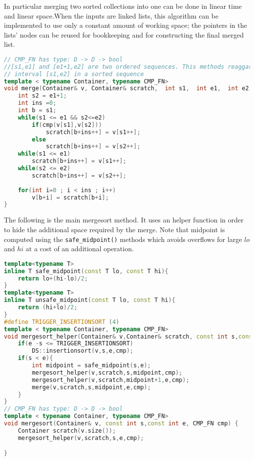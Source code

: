 In particular merging two sorted collections into one can be done in linear time and linear space.When the inputs are linked lists, this algorithm can be implemented to use only a constant amount of working space; the pointers in the lists' nodes can be reused for bookkeeping and for constructing the final merged list.

\begin{lstlisting}[language=c++, caption="Bubble-sort implementation in C++14"]
// CMP_FN has type: D -> D -> bool
//[s1,e1] and [e1+1,e2] are two ordered sequences. This methods reaggarne the whole
// interval [s1,e2] in a sorted sequence
template < typename Container, typename CMP_FN>
void merge(Container& v, Container& scratch,  int s1,  int e1,  int e2,CMP_FN cmp){
    int s2 = e1+1;
    int ins =0;
    int b = s1;
    while(s1 <= e1 && s2<=e2)
        if(cmp(v[s1],v[s2]))
            scratch[b+ins++] = v[s1++];
        else
            scratch[b+ins++] = v[s2++];
    while(s1 <= e1)
        scratch[b+ins++] = v[s1++];
    while(s2 <= e2)
        scratch[b+ins++] = v[s2++];
        
    for(int i=0 ; i < ins ; i++)
        v[b+i] = scratch[b+i];
}
\end{lstlisting}

The following is the main mergesort method. It uses an helper function in order to hide the additional space required by the merge. Note that midpoint is computed using the \texttt{safe\_midpoint()} methods which avoids overflows for large $lo$ and $hi$ at a cost of an additional operation.

\begin{lstlisting}[language=c++, caption="Merge-sort"]
template<typename T>
inline T safe_midpoint(const T lo, const T hi){
    return lo+(hi-lo)/2;
}
template<typename T>
inline T unsafe_midpoint(const T lo, const T hi){
    return (hi+lo)/2;
}
#define TRIGGER_INSERTIONSORT (4)
template < typename Container, typename CMP_FN>
void mergesort_helper(Container& v,Container& scratch, const int s,const int e, CMP_FN cmp) {
    if(e -s <= TRIGGER_INSERTIONSORT)
        DS::insertionsort(v,s,e,cmp);
    if(s < e){
        int midpoint = safe_midpoint(s,e);
        mergesort_helper(v,scratch,s,midpoint,cmp);
        mergesort_helper(v,scratch,midpoint+1,e,cmp);
        merge(v,scratch,s,midpoint,e,cmp);
    }
}
// CMP_FN has type: D -> D -> bool
template < typename Container, typename CMP_FN>
void mergesort(Container& v, const int s,const int e, CMP_FN cmp) {
    Container scratch(v.size());
    mergesort_helper(v,scratch,s,e,cmp);

}
\end{lstlisting}


